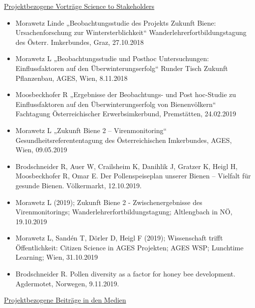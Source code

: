 \underline{Projektbezogene Vorträge Science to Stakeholders}

\begin{itemize}
    \item 
    Morawetz Linde „Beobachtungsstudie des Projekts Zukunft Biene: Ursachenforschung zur Wintersterblichkeit“ Wanderlehrerfortbildungstagung des Österr. Imkerbundes, Graz, 27.10.2018

    \item 
    Morawetz L „Beobachtungsstudie und Posthoc Untersuchungen: Einflussfaktoren auf den Überwinterungserfolg“ Runder Tisch Zukunft Pflanzenbau, AGES, Wien, 8.11.2018

    \item 
    Moosbeckhofer R „Ergebnisse der Beobachtungs- und Post hoc-Studie zu Einflussfaktoren auf den Überwinterungserfolg von Bienenvölkern“ Fachtagung Österreichischer Erwerbsimkerbund, Premstätten, 24.02.2019

    \item 
    Morawetz L „Zukunft Biene 2 – Virenmonitoring“ Gesundheitsreferententagung des Österreichischen Imkerbundes, AGES, Wien, 09.05.2019
    
    \item 
    Brodschneider R, Auer W, Crailsheim K, Danihlik J, Gratzer K, Heigl H, Moosbeckhofer R, Omar E. Der Pollenspeiseplan unserer Bienen – Vielfalt für gesunde Bienen. Völkermarkt, 12.10.2019.
    
    \item
    Morawetz L (2019); Zukunft Biene 2 - Zwischenergebnisse des Virenmonitorings;  Wanderlehrerfortbildungstagung; Altlengbach in NÖ, 19.10.2019
    
    \item
    Morawetz L, Sandén T, Dörler D, Heigl F (2019); Wissenschaft trifft Öffentlichkeit: Citizen Science in AGES Projekten; AGES WSP; Lunchtime Learning; Wien, 31.10.2019
    
    \item 
    Brodschneider R. Pollen diversity as a factor for honey bee development. Agdermotet, Norwegen, 9.11.2019.
    
\end{itemize}

\underline{Projektbezogene Beiträge in den Medien}

